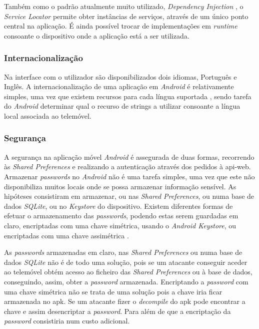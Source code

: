 Também como o padrão atualmente muito utilizado, \textit{Dependency Injection} \cite{MartinFowler:dependencyinjection}, o \textit{Service Locator} \cite{ServiceLocator:android} permite obter instâncias de serviços, através de um único ponto central na aplicação. É ainda possível trocar de implementações em \textit{runtime} consoante o dispositivo onde a aplicação está a ser utilizada.


\subsubsection{Internacionalização}

Na interface com o utilizador são disponibilizados dois idiomas, Português e Inglês. A internacionalização de uma aplicação em \textit{Android} é relativamente simples, uma vez que existem recursos para cada língua suportada \cite{Supportd:android}, sendo tarefa do \textit{Android} determinar qual o recurso de strings a utilizar consoante a língua local associada ao telemóvel.


\subsubsection{Segurança}

A segurança na aplicação móvel \textit{Android} é assegurada de duas formas, recorrendo às \textit{Shared Preferences} e realizando a autenticação através dos pedidos à \gls{api-web}. 
Armazenar \textit{passwords} no \textit{Android} não é uma tarefa simples, uma vez que este não disponibiliza muitos locais onde se possa armazenar informação sensível. As hipóteses consistiram em armazenar, ou nas \textit{Shared Preferences}, ou numa base de dados \textit{SQLite}, ou no \textit{Keystore} do dispositivo. Existem diferentes formas de efetuar o armazenamento das \textit{passwords}, podendo estas serem guardadas em claro, encriptadas com uma chave simétrica, usando o \textit{Android Keystore}, ou encriptadas com uma chave assimétrica \cite{Bestplacetostorepassword:android}.

As \textit{passwords} armazenadas em claro, nas \textit{Shared Preferences} ou numa base de dados \textit{SQLite} não é de todo uma solução, pois se um atacante conseguir aceder ao telemóvel obtém acesso ao ficheiro das \textit{Shared Preferences} ou à base de dados, conseguindo, assim, obter a \textit{password} armazenada. Encriptando a \textit{password} com uma chave simétrica não se trata de uma solução pois a chave iria ficar armazenada no \acrfull{apk}. Se um atacante fizer o \textit{decompile} do \acrshort{apk} pode encontrar a chave e assim desencriptar a \textit{password}. Para além de que a encriptação da \textit{password} consistiria num custo adicional. 


